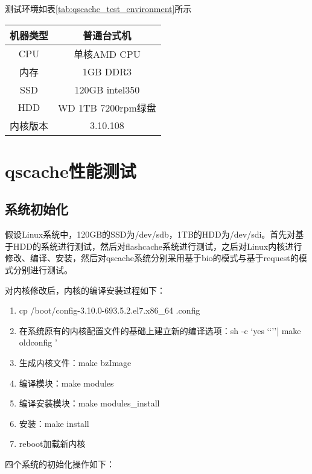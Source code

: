 测试环境如表\ref{tab:qscache_test_environment}所示

\begin{table}[H]
    \centering
    \begin{tabular}{cc} \toprule
      机器类型 & 普通台式机 \\ \midrule
      CPU & 单核AMD CPU\\
      内存 & 1GB DDR3\\
      SSD & 120GB intel350 \\
      HDD & WD 1TB 7200rpm绿盘\\
      内核版本 & 3.10.108\\
      \bottomrule
    \end{tabular}
\end{table}

\section{qscache性能测试}

\subsection{系统初始化}

假设Linux系统中，120GB的SSD为/dev/sdb，1TB的HDD为/dev/sdi。首先对基于HDD的系统进行测试，然后对flashcache系统进行测试，之后对Linux内核进行修改、编译、安装，然后对qscache系统分别采用基于bio的模式与基于request的模式分别进行测试。

对内核修改后，内核的编译安装过程如下：

\begin{enumerate}
    \item cp /boot/config-3.10.0-693.5.2.el7.x86\_64 .config
    \item 在系统原有的内核配置文件的基础上建立新的编译选项：sh -c \lq yes \lq\lq\rq\rq | make oldconfig \rq
    \item 生成内核文件：make bzImage
    \item 编译模块：make modules
    \item 编译安装模块：make modules\_install
    \item 安装：make install
    \item reboot加载新内核
\end{enumerate}

四个系统的初始化操作如下：

